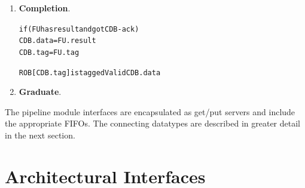 \documentclass[12pt]{article}
\begin{document}
\begin{enumerate}
    \item \textbf{Completion}.
        \begin{alltt}
            if (FU has result and got CDB-ack)
                CDB.data = FU.result
                CDB.tag = FU.tag
                
                ROB[CDB.tag] is tagged Valid CDB.data
        \end{alltt}
    \item \textbf{Graduate}.
        \begin{alltt}
            
        \end{alltt}
\end{enumerate}
The pipeline module interfaces are encapsulated as get/put servers and include the appropriate FIFOs. The connecting 
datatypes are described in greater detail in the next section.

\section{Architectural Interfaces}
\end{document}
